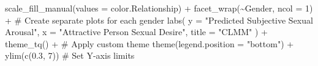 \documentclass[
  bookmarksnumbered]{article}
\newenvironment{Shaded}{\begin{snugshade}}{\end{snugshade}}
\newcommand{\AttributeTok}[1]{\textcolor[rgb]{0.80,0.80,0.80}{#1}}
\newcommand{\CommentTok}[1]{\textcolor[rgb]{0.50,0.62,0.50}{#1}}
\newcommand{\DecValTok}[1]{\textcolor[rgb]{0.86,0.86,0.80}{#1}}
\newcommand{\FloatTok}[1]{\textcolor[rgb]{0.75,0.75,0.82}{#1}}
\newcommand{\FunctionTok}[1]{\textcolor[rgb]{0.94,0.94,0.56}{#1}}
\newcommand{\NormalTok}[1]{\textcolor[rgb]{0.80,0.80,0.80}{#1}}
\newcommand{\SpecialCharTok}[1]{\textcolor[rgb]{0.86,0.64,0.64}{#1}}
\newcommand{\StringTok}[1]{\textcolor[rgb]{0.80,0.58,0.58}{#1}}
\begin{document}
\begin{Shaded}
\begin{Highlighting}[]
  \FunctionTok{scale\_fill\_manual}\NormalTok{(}\AttributeTok{values =}\NormalTok{ color.Relationship) }\SpecialCharTok{+}
  \FunctionTok{facet\_wrap}\NormalTok{(}\SpecialCharTok{\textasciitilde{}}\NormalTok{Gender, }\AttributeTok{ncol =} \DecValTok{1}\NormalTok{) }\SpecialCharTok{+} \CommentTok{\# Create separate plots for each gender}
  \FunctionTok{labs}\NormalTok{(}
    \AttributeTok{y =} \StringTok{"Predicted Subjective Sexual Arousal"}\NormalTok{, }\AttributeTok{x =} \StringTok{"Attractive Person Sexual Desire"}\NormalTok{,}
    \AttributeTok{title =} \StringTok{"CLMM"}
\NormalTok{  ) }\SpecialCharTok{+}
  \FunctionTok{theme\_tq}\NormalTok{() }\SpecialCharTok{+} \CommentTok{\# Apply custom theme}
  \FunctionTok{theme}\NormalTok{(}\AttributeTok{legend.position =} \StringTok{"bottom"}\NormalTok{) }\SpecialCharTok{+}
  \FunctionTok{ylim}\NormalTok{(}\FunctionTok{c}\NormalTok{(}\FloatTok{0.3}\NormalTok{, }\DecValTok{7}\NormalTok{)) }\CommentTok{\# Set Y{-}axis limits}


\end{Highlighting}
\end{Shaded}
\end{document}
